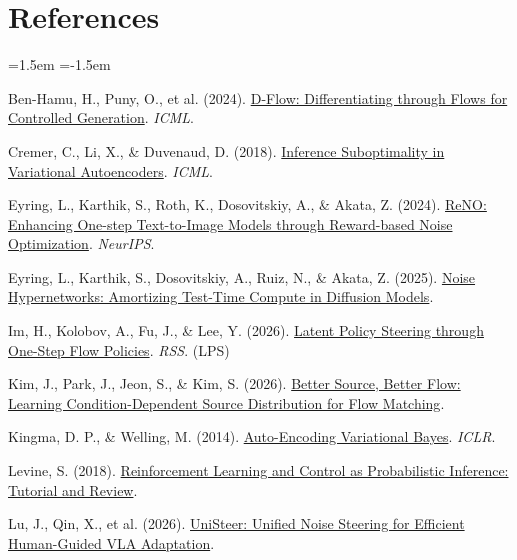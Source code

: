 \section*{References}
\begin{list}{}{\leftmargin=1.5em \itemindent=-1.5em \itemsep=2pt \parsep=0pt}
\small
\item {}Ben-Hamu, H., Puny, O., et al. (2024). \href{https://arxiv.org/abs/2402.14017}{D-Flow: Differentiating through Flows for Controlled Generation}. \emph{ICML}.
\item {}Cremer, C., Li, X., \& Duvenaud, D. (2018). \href{https://proceedings.mlr.press/v80/cremer18a.html}{Inference Suboptimality in Variational Autoencoders}. \emph{ICML}.
\item {}Eyring, L., Karthik, S., Roth, K., Dosovitskiy, A., \& Akata, Z. (2024). \href{https://arxiv.org/abs/2406.04312}{ReNO: Enhancing One-step Text-to-Image Models through Reward-based Noise Optimization}. \emph{NeurIPS}.
\item {}Eyring, L., Karthik, S., Dosovitskiy, A., Ruiz, N., \& Akata, Z. (2025). \href{https://arxiv.org/abs/2508.09968}{Noise Hypernetworks: Amortizing Test-Time Compute in Diffusion Models}.
\item {}Im, H., Kolobov, A., Fu, J., \& Lee, Y. (2026). \href{https://arxiv.org/abs/2603.05296}{Latent Policy Steering through One-Step Flow Policies}. \emph{RSS}. (LPS)
\item {}Kim, J., Park, J., Jeon, S., \& Kim, S. (2026). \href{https://arxiv.org/abs/2602.05951}{Better Source, Better Flow: Learning Condition-Dependent Source Distribution for Flow Matching}.
\item {}Kingma, D. P., \& Welling, M. (2014). \href{https://arxiv.org/abs/1312.6114}{Auto-Encoding Variational Bayes}. \emph{ICLR}.
\item {}Levine, S. (2018). \href{https://arxiv.org/abs/1805.00909}{Reinforcement Learning and Control as Probabilistic Inference: Tutorial and Review}.
\item {}Lu, J., Qin, X., et al. (2026). \href{https://arxiv.org/abs/2605.10821}{UniSteer: Unified Noise Steering for Efficient Human-Guided VLA Adaptation}.

\end{list}
